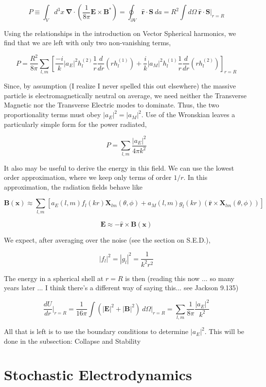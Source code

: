 \documentclass {article}
\renewcommand\vec{\mathbf}
\let\OldS\nabla
\renewcommand{\nabla}{\boldsymbol{\OldS}}
\let\OldHat\hat
\renewcommand{\hat}[1]{\OldHat{\mathbf{#1}}}
\begin{document}
$$P \equiv \int_V d^3x ~ \nabla \cdot \left( \frac 1 {8 \pi} \vec E \times \vec B^*\right) = \oint_{\partial V} \hat r \cdot \vec S ~ da = R^2 \int d\Omega ~ \hat r \cdot \vec S \bigg|_{r = R}$$

Using the relationships in the introduction on Vector Spherical harmonics, we find that we are left with only two non-vanishing terms,

$$P = \frac {R^2}{8 \pi} \sum_{l, m} \left[  \frac {-i} k |a_E|^2 h_l^{(2)} \frac 1 r \frac d {dr} \left( rh_l^{(1)} \right) + \frac i k |a_M|^2 h_l^{(1)} \frac 1 r \frac d {dr} \left( rh_l^{(2)}\right) \right]_{r=R}$$

Since, by assumption (I realize I never spelled this out elsewhere) the massive particle is electromagnetically neutral on average, we need neither the Transverse Magnetic nor the Transverse Electric modes to dominate. Thus, the two proportionality terms must obey $|a_E|^2 = |a_M|^2$. Use of the Wronskian leaves a particularly simple form for the power radiated,

$$P = \sum_{l,m} \frac {|a_E|^2} { 4 \pi k^2}$$

It also may be useful to derive the energy in this field. We can use the lowest order approximation, where we keep only terms of order $1/r$. In this approximation, the radiation fields behave like

$$\vec B (\vec x) \approx \sum_{l,m} \left[ a_E (l,m) f_l (kr) \vec X_{lm} (\theta, \phi) + a_M (l, m) g_l (kr) \left( \hat r \times \vec X_{lm} (\theta, \phi)  \right) \right]$$

$$ \vec E \approx - \hat r \times \vec B(\vec x) $$

We expect, after averaging over the noise (see the section on S.E.D.), 

$$|f_l|^2 = |g_l|^2 =  \frac 1 {k^2 r^2}$$

The energy in a spherical shell at $r =R$ is then (reading this now ... so many years later ... I think there's a different way of saying this... see Jackson 9.135)

$$\frac {dU} {dr} \bigg|_{r=R} = \frac 1 {16 \pi} \int \left( |\vec E  |^2 + |\vec B |^2 \right)~ d\Omega  \bigg|_{r=R} = \sum_{l, m} \frac 1 {8 \pi} \frac {|a_E|^2}{k^2}$$

All that is left is to use the boundary conditions to determine $|a_E|^2$. This will be done in the subsection: Collapse and Stability
\newpage

\section{Stochastic Electrodynamics}
\end{document}
